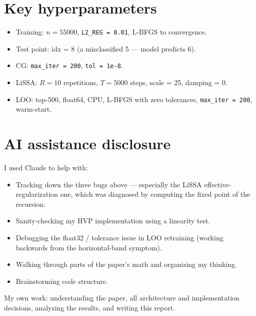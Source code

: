 \documentclass[a4paper,11pt]{article}
\begin{document}
\appendix

\section{Key hyperparameters}

\begin{itemize}[leftmargin=1.3em, itemsep=2pt]
  \item Training: $n = 55000$, \texttt{L2\_REG = 0.01}, L-BFGS to convergence.
  \item Test point: idx = 8 (a misclassified 5 --- model predicts 6).
  \item CG: \texttt{max\_iter = 200}, \texttt{tol = 1e-8}.
  \item LiSSA: $R = 10$ repetitions, $T = 5000$ steps, scale = 25, damping = 0.
  \item LOO: top-500, float64, CPU, L-BFGS with zero tolerances,
        \texttt{max\_iter = 200}, warm-start.
\end{itemize}

\section{AI assistance disclosure}

I used Claude to help with:
\begin{itemize}[leftmargin=1.3em, itemsep=2pt]
  \item Tracking down the three bugs above --- especially the LiSSA
        effective-regularization one, which was diagnosed by computing
        the fixed point of the recursion.
  \item Sanity-checking my HVP implementation using a linearity test.
  \item Debugging the float32 / tolerance issue in LOO retraining
        (working backwards from the horizontal-band symptom).
  \item Walking through parts of the paper's math and organizing my thinking.
  \item Brainstorming code structure.
\end{itemize}

My own work: understanding the paper, all architecture and implementation decisions,
analyzing the results, and writing this report.
\end{document}
